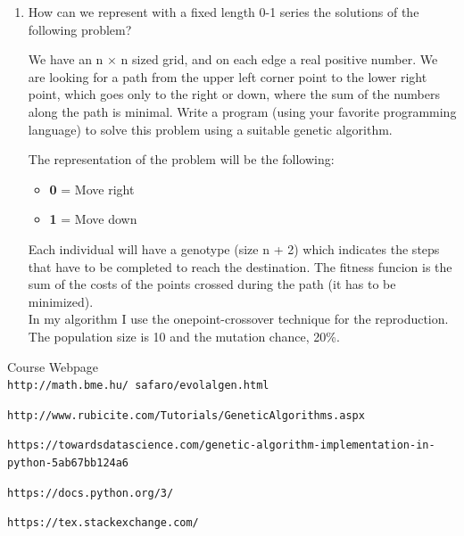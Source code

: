 \documentclass[12pt,english]{article}
\begin{document}
\begin{enumerate}
\item How can we represent with a fixed length 0-1 series the solutions of the following problem?

We have an n × n sized grid, and on each edge a real positive number.
We are looking for a path from the upper left corner point to the lower
right point, which goes only to the right or down, where the sum of the numbers along the path is minimal. Write a program (using your favorite programming language) to solve this problem using a suitable genetic algorithm.

The representation of the problem will be the following:
\begin{itemize}
	\item \textbf{0} = Move right
	\item \textbf{1} = Move down
\end{itemize}
Each individual will have a genotype (size n + 2) which indicates the steps that have to be completed to reach the destination. The fitness funcion is the sum of the costs of the points crossed during the path (it has to be minimized).\\

In my algorithm I use the onepoint-crossover technique for the reproduction. The population size is 10 and the mutation chance, 20\%.

\end{enumerate}


\begin{thebibliography}{9}

Course Webpage
\\\texttt{http://math.bme.hu/~safaro/evolalgen.html}

\texttt{http://www.rubicite.com/Tutorials/GeneticAlgorithms.aspx}

\texttt{https://towardsdatascience.com/genetic-algorithm-implementation-in-python-5ab67bb124a6}

\texttt{https://docs.python.org/3/}


\texttt{https://tex.stackexchange.com/}




\end{thebibliography}
\end{document}
